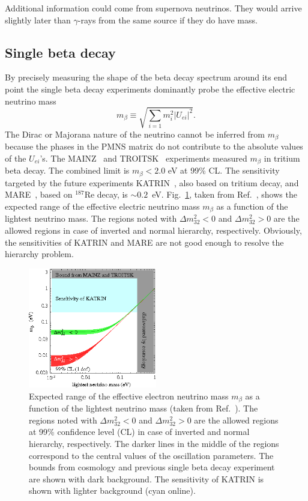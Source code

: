 Additional information could come from supernova neutrinos.
They would arrive slightly later than $\gamma$-rays from the same
source if they do have mass.

\subsection{Single beta decay}
\label{sec:sbd}
By precisely measuring the shape of the beta decay spectrum around its end point the single beta decay experiments dominantly probe the effective electric neutrino mass
\begin{equation}
  \label{eq:m1b}
  m_{\beta} \equiv \sqrt{\sum_{i=1}m_{i}^{2}|U_{ei}|^{2}}.
\end{equation}
The Dirac or Majorana nature of the neutrino cannot be inferred from $m_{\beta}$ because the phases in the PMNS matrix do not contribute to the absolute values of the $U_{ei}$'s. The MAINZ~\cite{Mai99} and TROITSK~\cite{Tro99} experiments measured $m_{\beta}$ in tritium beta decay. The combined limit is $m_{\beta} < 2.0$ eV at 99\% CL. The sensitivity targeted by the future experiments KATRIN~\cite{Kat01}, also based on tritium decay, and MARE~\cite{Mar05}, based on $^{187}$Re decay, is $\sim 0.2$~eV. Fig.~\ref{fig:m1bVSlightest}, taken from Ref.~\cite{Str05}, shows the expected range of the effective electric neutrino mass $m_{\beta}$ as a function of the lightest neutrino mass. The regions noted with $\Delta m^{2}_{32}<0$ and $\Delta m^{2}_{32}>0$ are the allowed regions in case of inverted and normal hierarchy, respectively. Obviously, the sensitivities of KATRIN and MARE are not good enough to resolve the hierarchy problem.
\begin{figure}[tbhp]
  \centering
  \includegraphics[width=0.5\textwidth]{m1bVSlightest.eps}  
  \caption{Expected range of the effective electron neutrino mass     $m_{\beta}$ as a function of the lightest neutrino mass (taken from     Ref.~\cite{Str05}). The regions noted with $\Delta m^{2}_{32}<0$     and $\Delta m^{2}_{32}>0$ are the allowed regions at 99\%     confidence level (CL) in case of inverted and normal hierarchy,     respectively. The darker lines in the middle of the regions     correspond to the central values of the oscillation parameters. The bounds from cosmology and previous single beta decay experiment are shown with dark background. The sensitivity of KATRIN is shown with lighter background (cyan online).}
  \label{fig:m1bVSlightest}
\end{figure}

